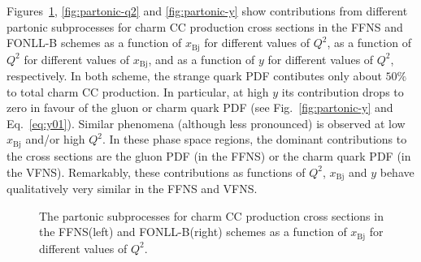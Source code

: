 \documentclass[pdftex,twocolumn,epjc3]{svjour3}          %
\newcommand{\xbj}{\ensuremath{x_{\text{Bj}}}\xspace}
\newcommand{\fonll} {{FONLL-B}\xspace}
\newcommand{\ffns} {{FFNS}\xspace}
\begin{document}
Figures~\ref{fig:partonic-x}, \ref{fig:partonic-q2} and \ref{fig:partonic-y} show contributions from different partonic subprocesses for charm CC production cross sections in the \ffns and \fonll schemes as a function of \xbj for different values of $Q^2$, as a function of $Q^2$ for different values of \xbj, and as a function of $y$ for different values of $Q^2$, respectively.
In both scheme, the strange quark PDF contibutes only about $50\%$ to total charm CC production. In particular, at high $y$ its contribution drops to zero in favour of the gluon or charm quark PDF (see Fig.~\ref{fig:partonic-y} and Eq.~\ref{eq:y01}). Similar phenomena (although less pronounced) is observed at low \xbj and/or high $Q^2$. In these phase space regions, the dominant contributions to the cross sections are the gluon PDF (in the FFNS) or the charm quark PDF (in the VFNS). Remarkably, these contributions as functions of $Q^2$, \xbj and $y$ behave qualitatively very similar in the FFNS and VFNS.

\begin{figure}
    \centering
    \caption{The partonic subprocesses for charm CC production cross sections in the \ffns (left) and \fonll (right) schemes as a function of \xbj for different values of $Q^2$.}
    \label{fig:partonic-x}
\end{figure}
\end{document}

